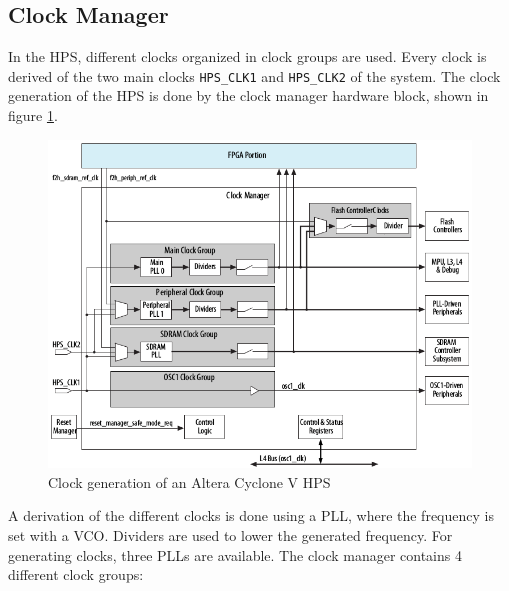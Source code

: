 \subsection{Clock Manager}
In the HPS, different clocks organized in clock groups are used. Every clock is derived of the two main clocks \texttt{HPS\_CLK1} and \texttt{HPS\_CLK2} of the system. The clock generation of the HPS is done by the clock manager hardware block, shown in figure \ref{fig:hpsclockmanager}. 
\begin{figure}[htbp]
\begin{center}
\includegraphics[width=15cm,keepaspectratio=true]{bilder/png/hpsclockmanager}
\caption{Clock generation of an Altera Cyclone V HPS\cite{altcycvov15}}
\label{fig:hpsclockmanager}
\end{center}
\end{figure}
A derivation of the different clocks is done using a PLL, where the frequency is set with a VCO. Dividers are used to lower the generated frequency. For generating clocks, three PLLs are available. The clock manager contains 4 different clock groups:
